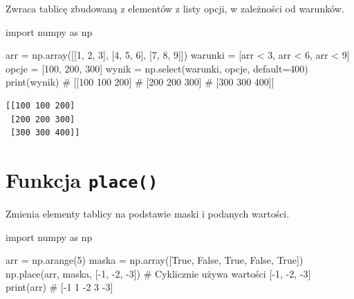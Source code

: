 \documentclass[
  polish,
  letterpaper,
  DIV=11,
  numbers=noendperiod]{scrreprt}
\newenvironment{Shaded}{\begin{snugshade}}{\end{snugshade}}
\newcommand{\BuiltInTok}[1]{\textcolor[rgb]{0.00,0.23,0.31}{#1}}
\newcommand{\CommentTok}[1]{\textcolor[rgb]{0.37,0.37,0.37}{#1}}
\newcommand{\DecValTok}[1]{\textcolor[rgb]{0.68,0.00,0.00}{#1}}
\newcommand{\ImportTok}[1]{\textcolor[rgb]{0.00,0.46,0.62}{#1}}
\newcommand{\NormalTok}[1]{\textcolor[rgb]{0.00,0.23,0.31}{#1}}
\newcommand{\OperatorTok}[1]{\textcolor[rgb]{0.37,0.37,0.37}{#1}}
\newcommand{\VariableTok}[1]{\textcolor[rgb]{0.07,0.07,0.07}{#1}}
\begin{document}
Zwraca tablicę zbudowaną z elementów z listy opcji, w zależności od
warunków.

\begin{Shaded}
\begin{Highlighting}[]
\ImportTok{import}\NormalTok{ numpy }\ImportTok{as}\NormalTok{ np}

\NormalTok{arr }\OperatorTok{=}\NormalTok{ np.array([[}\DecValTok{1}\NormalTok{, }\DecValTok{2}\NormalTok{, }\DecValTok{3}\NormalTok{], [}\DecValTok{4}\NormalTok{, }\DecValTok{5}\NormalTok{, }\DecValTok{6}\NormalTok{], [}\DecValTok{7}\NormalTok{, }\DecValTok{8}\NormalTok{, }\DecValTok{9}\NormalTok{]])}
\NormalTok{warunki }\OperatorTok{=}\NormalTok{ [arr }\OperatorTok{\textless{}} \DecValTok{3}\NormalTok{, arr }\OperatorTok{\textless{}} \DecValTok{6}\NormalTok{, arr }\OperatorTok{\textless{}} \DecValTok{9}\NormalTok{]}
\NormalTok{opcje }\OperatorTok{=}\NormalTok{ [}\DecValTok{100}\NormalTok{, }\DecValTok{200}\NormalTok{, }\DecValTok{300}\NormalTok{]}
\NormalTok{wynik }\OperatorTok{=}\NormalTok{ np.select(warunki, opcje, default}\OperatorTok{=}\DecValTok{400}\NormalTok{)}
\BuiltInTok{print}\NormalTok{(wynik)}
\CommentTok{\# [[100 100 200]}
\CommentTok{\#  [200 200 300]}
\CommentTok{\#  [300 300 400]]}
\end{Highlighting}
\end{Shaded}

\begin{verbatim}
[[100 100 200]
 [200 200 300]
 [300 300 400]]
\end{verbatim}

\section{\texorpdfstring{Funkcja
\texttt{place()}}{Funkcja place()}}\label{funkcja-place}

Zmienia elementy tablicy na podstawie maski i podanych wartości.

\begin{Shaded}
\begin{Highlighting}[]
\ImportTok{import}\NormalTok{ numpy }\ImportTok{as}\NormalTok{ np}

\NormalTok{arr }\OperatorTok{=}\NormalTok{ np.arange(}\DecValTok{5}\NormalTok{)}
\NormalTok{maska }\OperatorTok{=}\NormalTok{ np.array([}\VariableTok{True}\NormalTok{, }\VariableTok{False}\NormalTok{, }\VariableTok{True}\NormalTok{, }\VariableTok{False}\NormalTok{, }\VariableTok{True}\NormalTok{])}
\NormalTok{np.place(arr, maska, [}\OperatorTok{{-}}\DecValTok{1}\NormalTok{, }\OperatorTok{{-}}\DecValTok{2}\NormalTok{, }\OperatorTok{{-}}\DecValTok{3}\NormalTok{])  }\CommentTok{\# Cyklicznie używa wartości [{-}1, {-}2, {-}3]}
\BuiltInTok{print}\NormalTok{(arr)  }\CommentTok{\# [{-}1  1 {-}2  3 {-}3]}
\end{Highlighting}
\end{Shaded}
\end{document}
